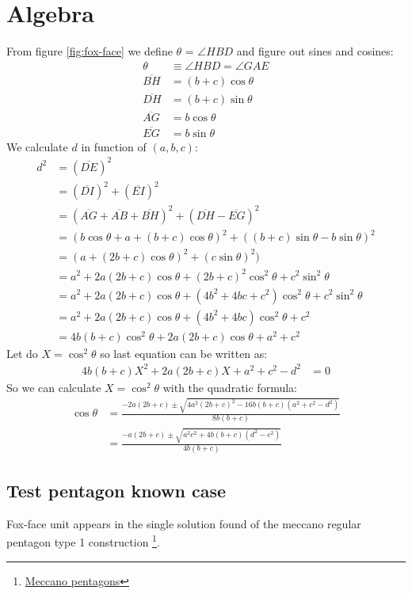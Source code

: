 \documentclass[11pt]{article}
\begin{document}
\section{Algebra}
From figure \ref{fig:fox-face} we define $\theta$ = $\angle{HBD}$ and figure out sines and cosines:
\begin{align}
\theta &\equiv \angle{HBD} = \angle{GAE}\\
\overline{BH} &= (b+c)\cos{\theta}\\
\overline{DH} &= (b+c)\sin{\theta}\\
\overline{AG} &= b\cos{\theta}\\
\overline{EG} &= b\sin{\theta}
\end{align}
We calculate $d$ in function of $(a,b,c)$:
\begin{align}
d^2 &= (\overline{DE})^2 \nonumber\\
 &= (\overline{DI})^2 + (\overline{EI})^2 \nonumber\\
 &= (\overline{AG} + \overline{AB} + \overline{BH})^2 + (\overline{DH} - \overline{EG})^2\\
 &= (b\cos{\theta} + a + (b+c)\cos{\theta})^2 + ((b+c)\sin{\theta} - b\sin{\theta})^2\\
 &= (a + (2b+c)\cos{\theta})^2 + (c\sin{\theta})^2)\nonumber\\
 &= a^2 + 2a(2b+c)\cos{\theta} + (2b+c)^2\cos^2{\theta} + c^2\sin^2{\theta}\nonumber\\
 &= a^2 + 2a(2b+c)\cos{\theta} + (4b^2 + 4bc + c^2)\cos^2{\theta} + c^2\sin^2{\theta}\nonumber\\
 &= a^2 + 2a(2b+c)\cos{\theta} + (4b^2 + 4bc)\cos^2{\theta} + c^2\nonumber\\
 &= 4b(b + c)\cos^2{\theta} + 2a(2b+c)\cos{\theta} + a^2 + c^2
\end{align}
Let do $X = \cos^2{\theta}$ so last equation can be written as:
\begin{align}
4b(b + c)X^2 + 2a(2b+c)X + a^2 + c^2 - d^2 &= 0
\end{align}
So we can calculate $X = \cos^2{\theta}$ with the quadratic formula:
\begin{align}
\cos{\theta} &= \frac{-2a(2b+c) \pm \sqrt{4a^2(2b+c)^2 - 16b(b+c)(a^2 + c^2 - d^2)}}{8b(b+c)} \nonumber\\
 &= \frac{-a(2b+c) \pm \sqrt{a^2c^2 + 4b(b+c)(d^2-c^2)}}{4b(b+c)}
\end{align}

\subsection{Test pentagon known case}
Fox-face unit appears in the single solution found of the meccano regular pentagon type 1 construction
\footnote{
\href{https://github.com/heptagons/meccano/penta}{Meccano pentagons}	
}.
\end{document}
